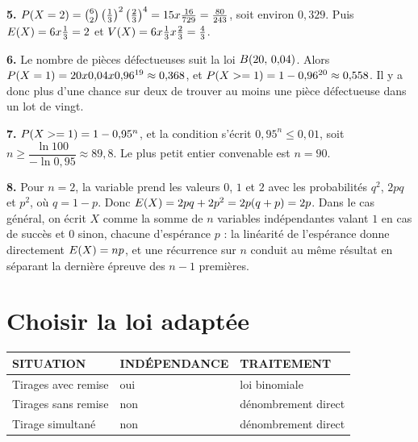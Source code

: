 \begin{corrige}
\textbf{5.} $\proba{X=2} = \combi{2}{6}\left(\frac13\right)^{2}
\left(\frac23\right)^{4} = 15 \times \frac{16}{729} = \frac{80}{243}$,
soit environ $0{,}329$. Puis $\Esp(X) = 6 \times \frac13 = 2$ et
$\Var(X) = 6 \times \frac13 \times \frac23 = \frac43$.

\textbf{6.} Le nombre de pièces défectueuses suit la loi
$\loibin{20}{0{,}04}$. Alors
$\proba{X=1} = 20 \times 0{,}04 \times 0{,}96^{19} \approx 0{,}368$, et
$\proba{X \geq 1} = 1-0{,}96^{20} \approx 0{,}558$. Il y a donc plus d'une
chance sur deux de trouver au moins une pièce défectueuse dans un lot de
vingt.

\textbf{7.} $\proba{X \geq 1} = 1-0{,}95^{n}$, et la condition s'écrit
$0{,}95^{n} \leq 0{,}01$, soit
$n \geq \dfrac{\ln 100}{-\ln 0{,}95} \approx 89{,}8$. Le plus petit entier
convenable est $n = 90$.

\textbf{8.} Pour $n = 2$, la variable prend les valeurs $0$, $1$ et $2$ avec
les probabilités $q^{2}$, $2pq$ et $p^{2}$, où $q = 1-p$. Donc
$\Esp(X) = 2pq+2p^{2} = 2p(q+p) = 2p$. Dans le cas général, on écrit $X$ comme
la somme de $n$ variables indépendantes valant $1$ en cas de succès et $0$
sinon, chacune d'espérance $p$ : la linéarité de l'espérance donne
directement $\Esp(X) = np$, et une récurrence sur $n$ conduit au même
résultat en séparant la dernière épreuve des $n-1$ premières.
\end{corrige}

\section{Choisir la loi adaptée}

\begin{propriete}
\begin{center}
\setlength{\tabcolsep}{8pt}
\renewcommand{\arraystretch}{1.3}
\begin{tabular}{@{}lll@{}}
\toprule
\textsf{\footnotesize\bfseries SITUATION} &
\textsf{\footnotesize\bfseries INDÉPENDANCE} &
\textsf{\footnotesize\bfseries TRAITEMENT} \\
\midrule
Tirages avec remise & oui & loi binomiale \\
Tirages sans remise & non & dénombrement direct \\
Tirage simultané & non & dénombrement direct \\
\bottomrule
\end{tabular}
\end{center}
\end{propriete}

